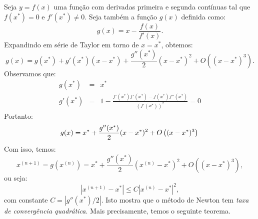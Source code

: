 Seja $y = f(x)$ uma função com derivadas primeira e segunda contínuas tal que $f(x^*)=0$ e $f'(x^*)\neq 0$. Seja também a função $g(x)$ definida como:
\begin{equation}
  g(x)=x-\frac{f(x)}{f'(x)}.
\end{equation}
Expandindo em série de Taylor em torno de $x = x^*$, obtemos:
\begin{equation}
  g(x)=g(x^*)+g'(x^*)(x-x^*) + \frac{g''(x^*)}{2}(x-x^*)^2 + O\left((x-x^*)^3\right).
\end{equation}
Observamos que:
\begin{eqnarray}
g(x^*) &=& x^*\\
g'(x^*) &=& 1 - \frac{f'(x^*)f'(x^*)-f(x^*)f''(x^*)}{\left(f'(x^*)\right)^2} = 0
\end{eqnarray}
Portanto:
\begin{equation}
g(x) = x^* + \frac{g''(x^*)}{2}(x-x^*)^2 + O\left((x-x^*)^3\right)\\
\end{equation}
Com isso, temos:
\begin{equation}
x^{(n+1)} = g(x^{(n)}) =  x^*+ \frac{g''(x^*)}{2}(x^{(n)}-x^*)^2 + O\left((x-x^*)^3\right),
\end{equation}
ou seja:
\begin{equation}
\left|x^{(n+1)}-x^*\right| \leq C\left|x^{(n)}-x^*\right|^2,
\end{equation}
com constante $C = \left|g''(x^*)/2\right|$. Isto mostra que o método de Newton tem \emph{taxa de convergência quadrática}. Mais precisamente, temos o seguinte teorema.

